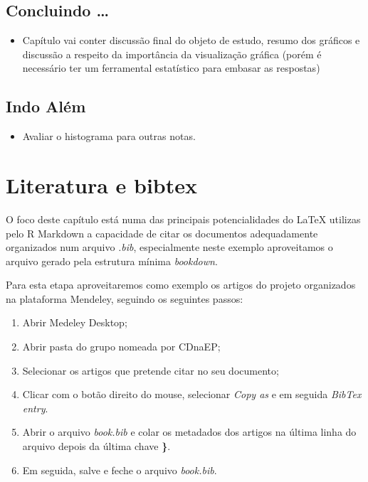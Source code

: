 \documentclass[
  oneside]{book}
\providecommand{\tightlist}{%
  \setlength{\itemsep}{0pt}\setlength{\parskip}{0pt}}
\begin{document}
\hypertarget{conc}{%
\section{Concluindo \ldots{}}\label{conc}}

\begin{itemize}
\tightlist
\item
  Capítulo vai conter discussão final do objeto de estudo, resumo dos gráficos e discussão a respeito da importância da visualização gráfica (porém é necessário ter um ferramental estatístico para embasar as respostas)
\end{itemize}

\hypertarget{indo-aluxe9m}{%
\section{Indo Além}\label{indo-aluxe9m}}

\begin{itemize}
\tightlist
\item
  Avaliar o histograma para outras notas.
\end{itemize}

\hypertarget{literatura-e-bibtex}{%
\chapter{Literatura e bibtex}\label{literatura-e-bibtex}}

O foco deste capítulo está numa das
principais potencialidades do LaTeX
utilizas pelo R Markdown a capacidade
de citar os documentos adequadamente
organizados num arquivo \emph{.bib},
especialmente neste exemplo aproveitamos
o arquivo gerado pela estrutura mínima
\emph{bookdown}.

Para esta etapa aproveitaremos como exemplo
os artigos do projeto organizados na
plataforma Mendeley, seguindo os
seguintes passos:

\begin{enumerate}
\def\labelenumi{\arabic{enumi}.}
\tightlist
\item
  Abrir Medeley Desktop;
\item
  Abrir pasta do grupo nomeada por CDnaEP;
\item
  Selecionar os artigos que pretende citar no seu documento;
\item
  Clicar com o botão direito do mouse, selecionar \emph{Copy as} e em seguida \emph{BibTex entry}.
\item
  Abrir o arquivo \emph{book.bib} e colar os metadados
  dos artigos na última linha do arquivo depois da
  última chave \textbf{\}}.
\item
  Em seguida, salve e feche o arquivo \emph{book.bib}.
\end{enumerate}
\end{document}
